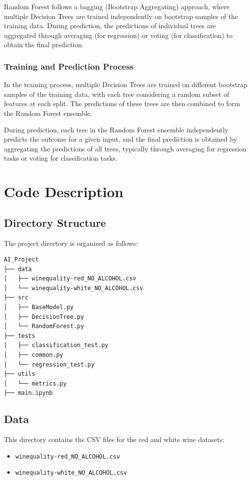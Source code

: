 \documentclass{ufazreport}
\begin{document}
Random Forest follows a bagging (Bootstrap Aggregating) approach, where multiple Decision Trees are trained independently on bootstrap samples of the training data. During prediction, the predictions of individual trees are aggregated through averaging (for regression) or voting (for classification) to obtain the final prediction.

\subsubsection{Training and Prediction Process}

In the training process, multiple Decision Trees are trained on different bootstrap samples of the training data, with each tree considering a random subset of features at each split. The predictions of these trees are then combined to form the Random Forest ensemble.

During prediction, each tree in the Random Forest ensemble independently predicts the outcome for a given input, and the final prediction is obtained by aggregating the predictions of all trees, typically through averaging for regression tasks or voting for classification tasks.

\section{Code Description}

\subsection{Directory Structure}

The project directory is organized as follows:

\begin{verbatim}
AI_Project
├── data
│   ├── winequality-red_NO_ALCOHOL.csv
│   └── winequality-white_NO_ALCOHOL.csv
├── src
│   ├── BaseModel.py
│   ├── DecisionTree.py
│   └── RandomForest.py
├── tests
│   ├── classification_test.py
│   ├── common.py
│   └── regression_test.py
├── utils
│   └── metrics.py
├── main.ipynb
\end{verbatim}

\subsection{Data}
This directory contains the CSV files for the red and white wine datasets:
\begin{itemize}
    \item \texttt{winequality-red\_NO\_ALCOHOL.csv}
    \item \texttt{winequality-white\_NO\_ALCOHOL.csv}
\end{itemize}
\end{document}
